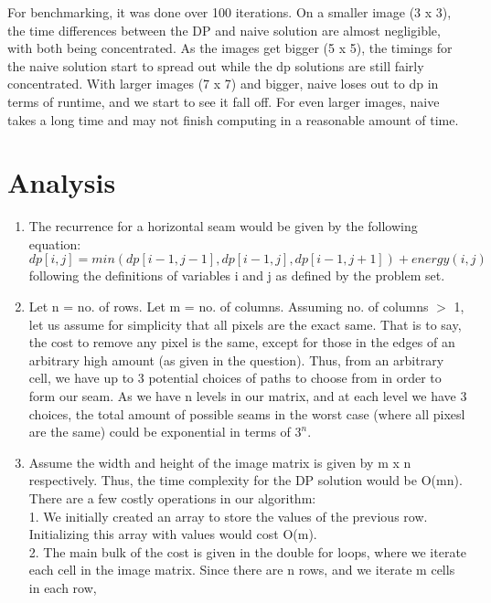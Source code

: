 \documentclass[12pt,letterpaper]{article}
\begin{document}
For benchmarking, it was done over 100 iterations.
On a smaller image (3 x 3), the time differences between the 
DP and naive solution are almost negligible, with both being concentrated.
As the images get bigger (5 x 5), the timings for the naive solution
start to spread out while the dp solutions are still fairly concentrated.
With larger images (7 x 7) and bigger, naive loses out to dp
in terms of runtime, and we start to see it fall off.
For even larger images, naive takes a long time and may not finish computing in a reasonable amount of time.

\section*{Analysis}

\begin{enumerate}
  \item
    The recurrence for a horizontal seam would be given by the following equation: \\
    \[
       dp[i, j] = min(dp[i - 1, j - 1], dp[i - 1, j], dp[i - 1, j + 1]) + energy(i, j)
    \]
    following the definitions of variables i and j as defined by the problem set.
  \item
    Let n = no. of rows. Let m = no. of columns. 
    Assuming no. of columns $>$ 1, let us assume for simplicity that all
    pixels are the exact same.
    That is to say, the cost to remove any pixel is the same,
    except for those in the edges of an arbitrary high amount (as given in the question).
    Thus, from an arbitrary cell, we have up to 3 potential choices 
    of paths to choose from in order to form our seam.
    As we have n levels in our matrix, and at each level we have 3 choices, 
    the total amount of possible seams in the worst case (where all pixesl are the same)
    could be exponential in terms of $3^n$.
  \item 
    Assume the width and height of the image matrix is given by m x n respectively.
    Thus, the time complexity for the DP solution would be O(mn). \\
    There are a few costly operations in our algorithm: \\
    1. We initially created an array to store the values of the previous row.
    Initializing this array with values would cost O(m). \\
    2. The main bulk of the cost is given in the double for loops,
    where we iterate each cell in the image matrix.
    Since there are n rows, and we iterate m cells in each row,

\end{enumerate}
\end{document}
